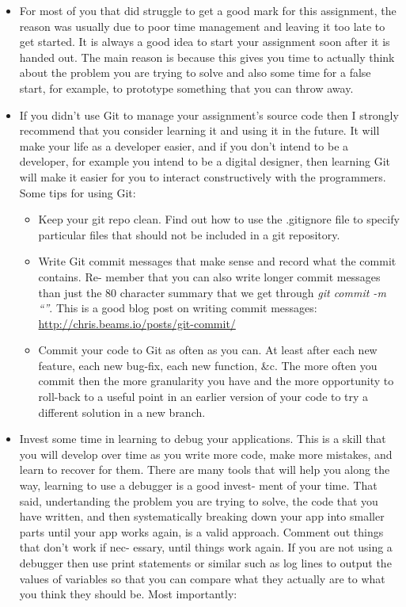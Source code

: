 \documentclass[letterpaper,11pt]{../resources/texMemo}
\begin{document}
\begin{itemize}
\item For most of you that did struggle to get a good mark for this assignment, the reason was usually due to poor time management and leaving it too late to get started. It is always a good idea to start your assignment soon after it is handed out. The main reason is because this gives you time to actually think about the problem you are trying to solve and also some time for a false start, for example, to prototype something that you can throw away.
\item If you didn’t use Git to manage your assignment's source code then I strongly recommend that you consider learning it and using it in the future. It will make your life as a developer easier, and if you don’t intend to be a developer, for example you intend to be a digital designer, then learning Git will make it easier for you to interact constructively with the programmers. Some tips for using Git:

\begin{itemize}
\item Keep your git repo clean. Find out how to use the .gitignore file to specify particular files that should not be included in a git repository.
\item Write Git commit messages that make sense and record what the commit contains. Re- member that you can also write longer commit messages than just the 80 character summary that we get through \emph{git commit -m ``''}. This is a good blog post on writing commit messages: \url{http://chris.beams.io/posts/git-commit/}
\item Commit your code to Git as often as you can. At least after each new feature, each new bug-fix, each new function, \&c. The more often you commit then the more granularity you have and the more opportunity to roll-back to a useful point in an earlier version of your code to try a different solution in a new branch.

\end{itemize}

\item Invest some time in learning to debug your applications. This is a skill that you will develop over time as you write more code, make more mistakes, and learn to recover for them. There are many tools that will help you along the way, learning to use a debugger is a good invest- ment of your time. That said, undertanding the problem you are trying to solve, the code that you have written, and then systematically breaking down your app into smaller parts until your app works again, is a valid approach. Comment out things that don’t work if nec- essary, until things work again. If you are not using a debugger then use print statements or similar such as log lines to output the values of variables so that you can compare what they actually are to what you think they should be. Most importantly:


\end{itemize}
\end{document}
